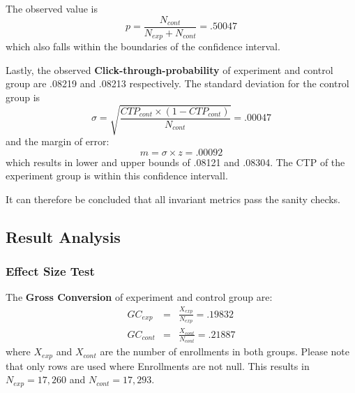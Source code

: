 \documentclass[11pt]{article} %
\begin{document}
The observed value is 
\begin{equation}
	p = \frac{N_{cont}}{N_{exp}+N_{cont}} = .50047
\end{equation}
which also falls within the boundaries of the confidence interval.\medskip

Lastly, the observed \textbf{Click-through-probability} of experiment and control group are .08219 and .08213 respectively. The standard deviation for the control group is
\begin{equation}
	\sigma = \sqrt{\frac{CTP_{cont}\times (1-CTP_{cont})}{N_{cont}}} = .00047
\end{equation}
and the margin of error:
\begin{equation}
	m = \sigma \times z = .00092
\end{equation}
which results in lower and upper bounds of .08121 and .08304. The CTP of the experiment group is within this confidence intervall.\medskip

It can therefore be concluded that all invariant metrics pass the sanity checks.

\subsection{Result Analysis}

\subsubsection{Effect Size Test}

The \textbf{Gross Conversion} of experiment and control group are:
\begin{eqnarray}
	GC_{exp} &=& \frac{X_{exp}}{N_{exp}} =  .19832\\
	GC_{cont} &=& \frac{X_{cont}}{N_{cont}}= .21887
\end{eqnarray}
where $X_{exp}$ and $X_{cont}$ are the number of enrollments in both groups. Please note that only rows are used where Enrollments are not null. This results in $N_{exp}=17,260$ and $N_{cont}=17,293$. \medskip
\end{document}
